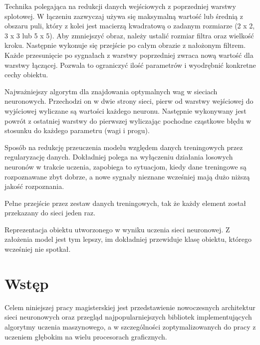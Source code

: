\documentclass[12pt,a4paper,twoside,titlepage,openright]{book}
\begin{document}
\begin{description}[style=nextline]
	\item[Łączenie (ang. \textit{pooling})] Technika polegająca na redukcji danych wejściowych z poprzedniej warstwy splotowej. W łączeniu zazwyczaj używa się maksymalną wartość lub średnią z obszaru puli, który z kolei jest macierzą kwadratową o zadanym rozmiarze (2 x 2, 3 x 3 lub 5 x 5). Aby zmniejszyć obraz, należy ustalić rozmiar filtra oraz wielkość kroku. Następnie wykonuje się przejście po całym obrazie z nałożonym filtrem. Każde przesunięcie po sygnałach z warstwy poprzedniej zwraca nową wartość dla warstwy łączącej. Pozwala to ograniczyć ilość parametrów i wyodrębnić konkretne cechy obiektu.
	\item[Wsteczna propagacja błędu] Najważniejszy algorytm dla znajdowania optymalnych wag w sieciach neuronowych. Przechodzi on w dwie strony sieci, pierw od warstwy wejściowej do wyjściowej wyliczane są wartości każdego neuronu. Następnie wykonywany jest powrót z ostatniej warstwy do pierwszej wyliczając pochodne cząstkowe błędu w stosunku do każdego parametru (wagi i progu).	
	\item[Wyrzucanie połączeń (ang. \textit{dropout})] Sposób na redukcję przeuczenia modelu względem danych treningowych przez regularyzację danych. Dokładniej polega na wyłączeniu działania losowych neuronów w trakcie uczenia, zapobiega to sytuacjom, kiedy dane treningowe są rozpoznawane zbyt dobrze, a nowe sygnały nieznane wcześniej mają dużo niższą jakość rozpoznania.
	\item[Epoka] Pełne przejście przez zestaw danych treningowych, tak że każdy element został przekazany do sieci jeden raz.
	\item[Model] Reprezentacja obiektu utworzonego w wyniku uczenia sieci neuronowej. Z założenia model jest tym lepszy, im dokładniej przewiduje klasę obiektu, którego wcześniej nie spotkał.
\end{description}
 

\chapter*{Wstęp}
Celem niniejszej pracy magisterskiej jest przedstawienie nowoczesnych architektur sieci neuronowych oraz przegląd najpopularniejszych bibliotek implementujących algorytmy uczenia maszynowego, a w szczególności zoptymalizowanych do pracy z uczeniem głębokim na wielu procesorach graficznych. 
\end{document}
